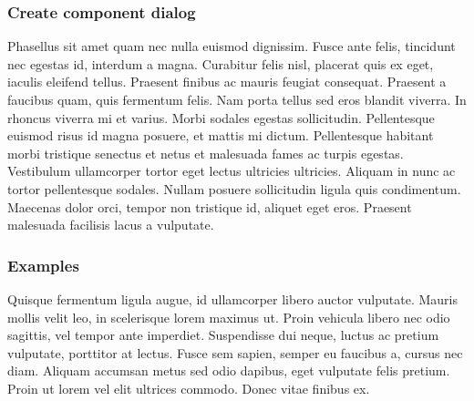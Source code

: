 \subsubsection{Create component dialog}
    Phasellus sit amet quam nec nulla euismod dignissim. Fusce ante felis, tincidunt nec egestas id, interdum a magna. Curabitur felis nisl, placerat quis ex eget, iaculis eleifend tellus. Praesent finibus ac mauris feugiat consequat. Praesent a faucibus quam, quis fermentum felis. Nam porta tellus sed eros blandit viverra. In rhoncus viverra mi et varius. Morbi sodales egestas sollicitudin. Pellentesque euismod risus id magna posuere, et mattis mi dictum. Pellentesque habitant morbi tristique senectus et netus et malesuada fames ac turpis egestas. Vestibulum ullamcorper tortor eget lectus ultricies ultricies. Aliquam in nunc ac tortor pellentesque sodales. Nullam posuere sollicitudin ligula quis condimentum. Maecenas dolor orci, tempor non tristique id, aliquet eget eros. Praesent malesuada facilisis lacus a vulputate.

\subsubsection{Examples}
    Quisque fermentum ligula augue, id ullamcorper libero auctor vulputate. Mauris mollis velit leo, in scelerisque lorem maximus ut. Proin vehicula libero nec odio sagittis, vel tempor ante imperdiet. Suspendisse dui neque, luctus ac pretium vulputate, porttitor at lectus. Fusce sem sapien, semper eu faucibus a, cursus nec diam. Aliquam accumsan metus sed odio dapibus, eget vulputate felis pretium. Proin ut lorem vel elit ultrices commodo. Donec vitae finibus ex.